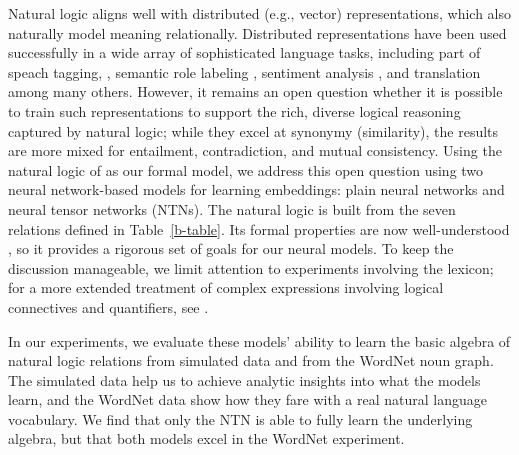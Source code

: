 \documentclass[letterpaper]{article}
\begin{document}
Natural logic aligns well with distributed (e.g., vector)
representations, which also naturally model meaning relationally.
Distributed representations have been used successfully in a wide
array of sophisticated language tasks, including part of speach tagging,
\cite{collobert2011natural}, semantic role labeling \cite{collobert2011natural},
sentiment analysis \cite{socher2011semi}, and translation \cite{sutskever2014sequence} 
among many others.
However, it remains an open question whether it is possible to train
such representations to support the rich, diverse logical reasoning
captured by natural logic; while they excel at synonymy (similarity),
the results are more mixed for entailment, contradiction, and mutual
consistency.  Using the natural logic of \cite{maccartney2009extended}
as our formal model, we address this open question using two neural
network-based models for learning embeddings: plain neural networks
and neural tensor networks (NTNs).  The natural logic is built from
the seven relations defined in Table~\ref{b-table}. Its formal
properties are now well-understood \cite{Icard:Moss:2013:LILT}, so it
provides a rigorous set of goals for our neural models. To keep the
discussion manageable, we limit attention to experiments involving the
lexicon; for a more extended treatment of complex expressions
involving logical connectives and quantifiers, see
\cite{Bowman:Potts:Manning:2014}. %

In our experiments, we evaluate these models' ability to learn the
basic algebra of natural logic relations from simulated data and from
the WordNet noun graph. The simulated data help us to achieve analytic
insights into what the models learn, and the WordNet data show how they
fare with a real natural language vocabulary.  We find that only the NTN is able to fully
learn the underlying algebra, but that both models excel in the 
WordNet experiment.
\end{document}
